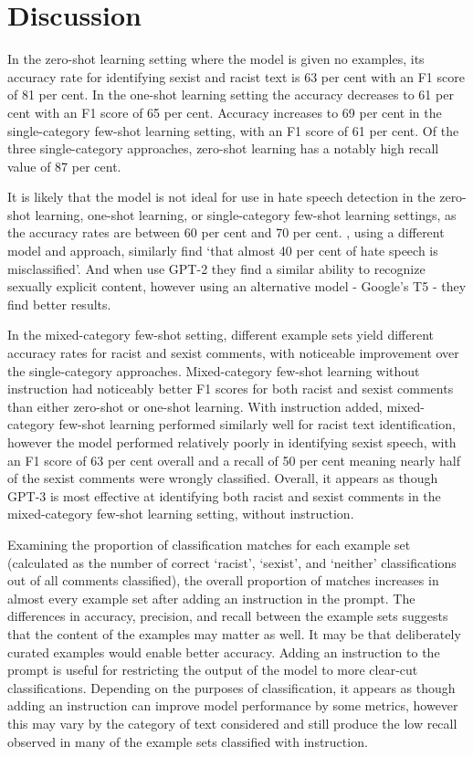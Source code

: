 \documentclass[12pt,]{article}
\begin{document}
\hypertarget{discussion}{%
\section{Discussion}\label{discussion}}

In the zero-shot learning setting where the model is given no examples, its accuracy rate for identifying sexist and racist text is 63 per cent with an F1 score of 81 per cent. In the one-shot learning setting the accuracy decreases to 61 per cent with an F1 score of 65 per cent. Accuracy increases to 69 per cent in the single-category few-shot learning setting, with an F1 score of 61 per cent. Of the three single-category approaches, zero-shot learning has a notably high recall value of 87 per cent.

It is likely that the model is not ideal for use in hate speech detection in the zero-shot learning, one-shot learning, or single-category few-shot learning settings, as the accuracy rates are between 60 per cent and 70 per cent. \citet{davidson2017automated}, using a different model and approach, similarly find `that almost 40 per cent of hate speech is misclassified'. And when \citet{schick2021selfdiagnosis} use GPT-2 they find a similar ability to recognize sexually explicit content, however using an alternative model - Google's T5 \citep{raffel2020exploring} - they find better results.

In the mixed-category few-shot setting, different example sets yield different accuracy rates for racist and sexist comments, with noticeable improvement over the single-category approaches. Mixed-category few-shot learning without instruction had noticeably better F1 scores for both racist and sexist comments than either zero-shot or one-shot learning. With instruction added, mixed-category few-shot learning performed similarly well for racist text identification, however the model performed relatively poorly in identifying sexist speech, with an F1 score of 63 per cent overall and a recall of 50 per cent meaning nearly half of the sexist comments were wrongly classified. Overall, it appears as though GPT-3 is most effective at identifying both racist and sexist comments in the mixed-category few-shot learning setting, without instruction.

Examining the proportion of classification matches for each example set (calculated as the number of correct `racist', `sexist', and `neither' classifications out of all comments classified), the overall proportion of matches increases in almost every example set after adding an instruction in the prompt. The differences in accuracy, precision, and recall between the example sets suggests that the content of the examples may matter as well. It may be that deliberately curated examples would enable better accuracy. Adding an instruction to the prompt is useful for restricting the output of the model to more clear-cut classifications. Depending on the purposes of classification, it appears as though adding an instruction can improve model performance by some metrics, however this may vary by the category of text considered and still produce the low recall observed in many of the example sets classified with instruction.
\end{document}
